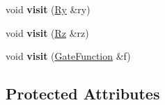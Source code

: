 \begin{DoxyCompactItemize}
\item 
void {\bfseries visit} (\hyperlink{a00062}{Ry} \&ry)\hypertarget{a00031_aa22aad7b316386f5ef35672337c05ffc}{}\label{a00031_aa22aad7b316386f5ef35672337c05ffc}

\item 
void {\bfseries visit} (\hyperlink{a00063}{Rz} \&rz)\hypertarget{a00031_a8857ecf8f8f1b6143da8f31a722fe03e}{}\label{a00031_a8857ecf8f8f1b6143da8f31a722fe03e}

\item 
void {\bfseries visit} (\hyperlink{a00032}{Gate\+Function} \&f)\hypertarget{a00031_ad7d15225cf258fe59660ba828baff357}{}\label{a00031_ad7d15225cf258fe59660ba828baff357}

\end{DoxyCompactItemize}
\subsection*{Protected Attributes}
